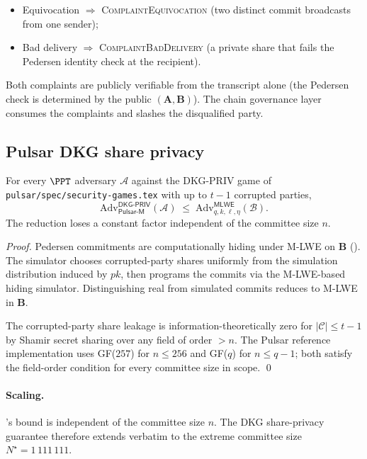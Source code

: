 \begin{itemize}[leftmargin=*, itemsep=0pt]
\item Equivocation $\Rightarrow$ \textsc{ComplaintEquivocation} (two
distinct commit broadcasts from one sender);
\item Bad delivery $\Rightarrow$ \textsc{ComplaintBadDelivery} (a
private share that fails the Pedersen identity check at the
recipient).
\end{itemize}

Both complaints are publicly verifiable from the transcript alone
(the Pedersen check is determined by the public $(\mathbf{A},
\mathbf{B})$). The chain governance layer consumes the complaints
and slashes the disqualified party.

\subsection*{Pulsar DKG share privacy}

\begin{theorem}
\label{thm:pulsar-dkg-priv}
For every $\PPT$ adversary $\mathcal{A}$ against the DKG-PRIV game
of \texttt{pulsar/spec/security-games.tex} with up to $t-1$
corrupted parties,
\[
  \mathrm{Adv}^{\mathsf{DKG\text{-}PRIV}}_{\mathsf{Pulsar\text{-}M}}(\mathcal{A})
  \;\le\;
  \mathrm{Adv}^{\mathsf{MLWE}}_{q, k, \ell, \eta}(\mathcal{B}).
\]
The reduction loses a constant factor independent of the committee
size $n$.
\end{theorem}

\begin{proof}
Pedersen commitments are computationally hiding under M-LWE on
$\mathbf{B}$ (). The simulator chooses
corrupted-party shares uniformly from the simulation distribution
induced by $\mathit{pk}$, then programs the commits via the
M-LWE-based hiding simulator. Distinguishing real from simulated
commits reduces to M-LWE in $\mathbf{B}$.

The corrupted-party share leakage is information-theoretically zero
for $|\mathcal{C}| \le t - 1$ by Shamir secret sharing over any
field of order $> n$. The Pulsar reference implementation uses
GF($257$) for $n \le 256$ and GF($q$) for $n \le q - 1$; both
satisfy the field-order condition for every committee size in
scope. \qed
\end{proof}

\paragraph{Scaling.}
's bound is independent of the
committee size $n$. The DKG share-privacy guarantee therefore
extends verbatim to the extreme committee size $N^\star =
1\,111\,111$.
